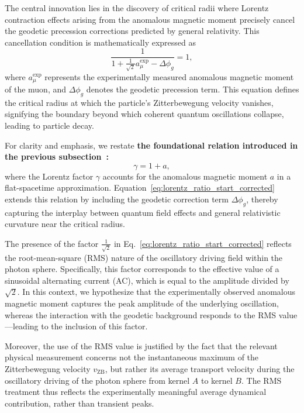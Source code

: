 \documentclass[%
 reprint,
 amsmath,amssymb,
 aps,
]{revtex4-1}
\numberwithin{equation}{section}%
\begin{document}
The central innovation lies in the discovery of critical radii where Lorentz contraction effects arising from the anomalous magnetic moment precisely cancel the geodetic precession corrections predicted by general relativity. This cancellation condition is mathematically expressed as
\begin{equation}
   \frac{1}{1 + \frac{1}{\sqrt{2}}a^{\text{exp}}_{\mu} - \Delta\phi_g} = 1,
\label{eq:lorentz_ratio_start_corrected}
\end{equation}
where \( a^{\text{exp}}_{\mu} \) represents the experimentally measured anomalous magnetic moment of the muon, and \( \Delta\phi_g \) denotes the geodetic precession term. This equation defines the critical radius at which the particle’s Zitterbewegung velocity vanishes, signifying the boundary beyond which coherent quantum oscillations collapse, leading to particle decay.

For clarity and emphasis, we restate \textbf{the foundational relation introduced in the previous subsection~\cite{hanamura2504.0115}:}
\begin{equation}
\gamma = 1 + a,
\label{eq:gamma_anomaly_relation}
\end{equation}
where the Lorentz factor \( \gamma \) accounts for the anomalous magnetic moment \( a \) in a flat-spacetime approximation. Equation~\eqref{eq:lorentz_ratio_start_corrected} extends this relation by including the geodetic correction term \( \Delta\phi_g \), thereby capturing the interplay between quantum field effects and general relativistic curvature near the critical radius.

The presence of the factor \( \frac{1}{\sqrt{2}} \) in Eq.~\eqref{eq:lorentz_ratio_start_corrected} reflects the root-mean-square (RMS) nature of the oscillatory driving field within the photon sphere. Specifically, this factor corresponds to the effective value of a sinusoidal alternating current (AC), which is equal to the amplitude divided by \( \sqrt{2} \). In this context, we hypothesize that the experimentally observed anomalous magnetic moment captures the peak amplitude of the underlying oscillation, whereas the interaction with the geodetic background responds to the RMS value—leading to the inclusion of this factor. 

Moreover, the use of the RMS value is justified by the fact that the relevant physical measurement concerns not the instantaneous maximum of the Zitterbewegung velocity \( v_{\mathrm{ZB}} \), but rather its average transport velocity during the oscillatory driving of the photon sphere from kernel $A$ to kernel $B$. The RMS treatment thus reflects the experimentally meaningful average dynamical contribution, rather than transient peaks.
\end{document}
